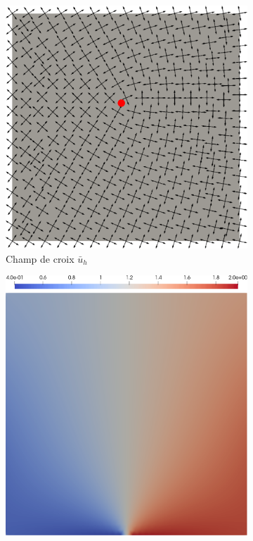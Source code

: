 \begin{figure}[h!]
\centering
\begin{subfigure}{0.515\textwidth}
    \includegraphics[width=\textwidth]{images/alignment_1.pdf}
    \caption{Champ de croix $\bar{u}_h$}
    \label{fig:alignment_1}
\end{subfigure}
\hfill
\begin{subfigure}{0.478\textwidth}
    \includegraphics[width=\textwidth]{images/alignment_2.pdf}

\end{subfigure}
\end{figure}
